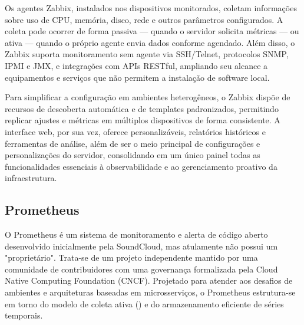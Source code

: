 Os agentes Zabbix, instalados nos dispositivos monitorados, coletam informações sobre uso de CPU, memória, disco, rede e outros parâmetros configurados. A coleta pode ocorrer de forma passiva --- quando o servidor solicita métricas --- ou ativa --- quando o próprio agente envia dados conforme agendado. Além disso, o Zabbix suporta monitoramento sem agente via SSH/Telnet, protocolos SNMP, IPMI e JMX, e integrações com APIs RESTful, ampliando seu alcance a equipamentos e serviços que não permitem a instalação de software local.

Para simplificar a configuração em ambientes heterogêneos, o Zabbix dispõe de recursos de descoberta automática e de templates padronizados, permitindo replicar ajustes e métricas em múltiplos dispositivos de forma consistente. A interface web, por sua vez, oferece  personalizáveis, relatórios históricos e ferramentas de análise, além de ser o meio principal de configurações e personalizações do servidor, consolidando em um único painel todas as funcionalidades essenciais à observabilidade e ao gerenciamento proativo da infraestrutura.

\subsection{Prometheus}
\label{subsection:Prometheus}

O Prometheus \citep{prometheus2025} é um sistema de monitoramento e alerta de código aberto desenvolvido inicialmente pela SoundCloud, mas atulamente não possui um "proprietário". Trata-se de um projeto independente mantido por uma comunidade de contribuidores com uma governança formalizada pela Cloud Native Computing Foundation (CNCF). Projetado para atender aos desafios de ambientes  e arquiteturas baseadas em microsserviços, o Prometheus estrutura-se em torno do modelo de coleta ativa () e do armazenamento eficiente de séries temporais.

